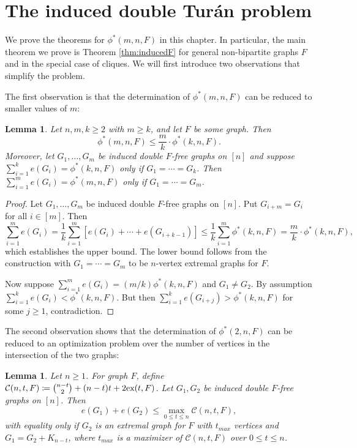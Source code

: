 \documentclass[12pt]{article}
\newtheorem{lemma}[theorem]{Lemma}
\newcommand*{\ex}{\textnormal{ex}}
\newcommand*{\con}{\mathcal{C}}
\begin{document}
\section{The induced double Tur\'{a}n problem}

We prove the theorems for $\phi^*(m, n ,F)$ in this chapter. In particular, the main theorem we prove is Theorem \ref{thm:inducedF} for general non-bipartite graphs $F$ and in the special case of cliques. We will first introduce two observations that simplify the problem.

The first observation is that the determination of $\phi^*(m, n, F)$ can be reduced to smaller values of $m$:

\begin{lemma}\label{lem:induce-reduce}
  Let $n, m, k \geq 2$ with $m \geq k$, and let $F$ be some graph. Then
  \[
    \phi^*(m, n, F) \leq \frac{m}{k} \cdot \phi^*(k, n, F).
  \]
  Moreover, let $G_1, \ldots, G_m$ be induced double $F$-free graphs on $[n]$ and suppose $\sum_{i = 1}^k e(G_i) = \phi^*(k, n, F)$ only if $G_1 = \cdots = G_k$. Then $\sum_{i = 1}^m e(G_i) = \phi^*(m, n, F)$ only if $G_1 = \cdots = G_m$.
\end{lemma}

\begin{proof}
  Let $G_1, \ldots, G_m$ be induced double $F$-free graphs on $[n]$. Put $G_{i + m} = G_i$ for all $i \in [m]$. Then
  \[
    \sum_{i = 1}^m e(G_i) = \frac{1}{k}\sum_{i = 1}^m [e(G_i) + \cdots + e(G_{i + k - 1})] \leq \frac{1}{k}\sum_{i = 1}^m \phi^*(k, n, F) = \frac{m}{k} \cdot \phi^*(k, n, F),
  \]
  which establishes the upper bound. The lower bound follows from the construction with $G_1 = \cdots = G_m$ to be $n$-vertex extremal graphs for $F$.

  Now suppose $\sum_{i = 1}^m e(G_i) = (m/k)\phi^*(k, n, F)$ and $G_1 \neq G_2$. By assumption $\sum_{i = 1}^k e(G_i) < \phi^*(k, n, F)$. But then $\sum_{i = 1}^k e(G_{i + j}) > \phi^*(k, n, F)$ for some $j \geq 1$, contradiction. 
\end{proof}

The second observation shows that the determination of $\phi^*(2, n, F)$ can be reduced to an optimization problem over the number of vertices in the intersection of the two graphs:

\begin{lemma}\label{lem:optimize-con}
  Let $n \geq 1$. For graph $F$, define $\con(n, t, F) \coloneq \binom{n - t}{2} + (n - t)t + 2\ex(t, F)$. Let $G_1, G_2$ be induced double $F$-free graphs on $[n]$. Then
  \[
    e(G_1) + e(G_2) \leq \max_{0 \leq t \leq n} \con(n, t, F),
  \]
  with equality only if $G_2$ is an extremal graph for $F$ with $t_{max}$ vertices and $G_1 = G_2 + K_{n - t}$, where $t_{max}$ is a maximizer of $\con(n, t, F)$ over $0 \leq t \leq n$.
\end{lemma}
\end{document}
